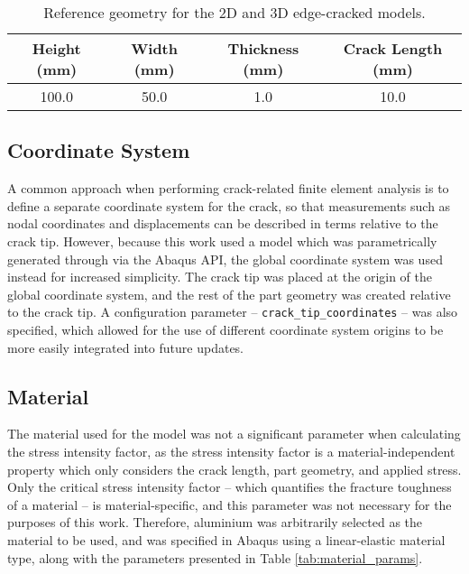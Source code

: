 \renewcommand{\arraystretch}{1.5}

\begin{table}[htbp]
	\centering
	\caption{Reference geometry for the 2D and 3D edge-cracked models.}
	\label{tab:part_geometry}
	\begin{tabular}{|c|c|c|c|}
		\hline
		\textbf{Height (mm)} & \textbf{Width (mm)} & \textbf{Thickness (mm)} & \textbf{Crack Length (mm)} \\ \hline
		100.0 & 50.0 & 1.0 & 10.0 \\ \hline
	\end{tabular}
\end{table}

\subsection{Coordinate System}

A common approach when performing crack-related finite element analysis is to define a separate coordinate system for the crack, so that measurements such as nodal coordinates and displacements can be described in terms relative to the crack tip. However, because this work used a model which was parametrically generated through via the Abaqus API, the global coordinate system was used instead for increased simplicity. The crack tip was placed at the origin of the global coordinate system, and the rest of the part geometry was created relative to the crack tip. A configuration parameter -- \texttt{crack\_tip\_coordinates} -- was also specified, which allowed for the use of different coordinate system origins to be more easily integrated into future updates.

\newpage
\subsection{Material}

The material used for the model was not a significant parameter when calculating the stress intensity factor, as the stress intensity factor is a material-independent property which only considers the crack length, part geometry, and applied stress. Only the critical stress intensity factor -- which quantifies the fracture toughness of a material -- is material-specific, and this parameter was not necessary for the purposes of this work. Therefore, aluminium was arbitrarily selected as the material to be used, and was specified in Abaqus using a linear-elastic material type, along with the parameters presented in Table \ref{tab:material_params}.


